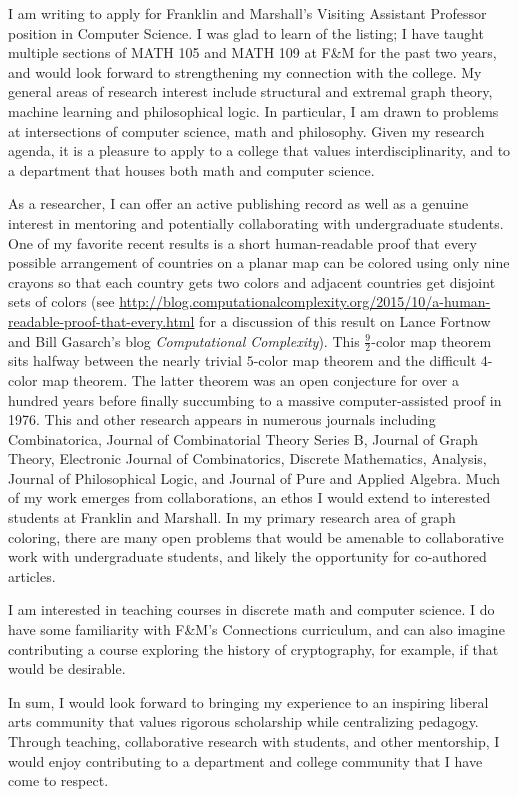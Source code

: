 \documentclass[10pt,stdletter,dateno]{newlfm}
\begin{document}
\begin{newlfm}

I am writing to apply for Franklin and Marshall's Visiting Assistant Professor position in Computer Science.
I was glad to learn of the listing; 
I have taught multiple sections of MATH 105 and MATH 109 at F\&M for the past two years, and would look forward to strengthening my connection with the college. 
My general areas of research interest include structural and extremal graph theory, machine learning and philosophical logic. In particular, I am 
drawn to problems at intersections of computer science, math and philosophy. Given my research agenda, it is a pleasure to apply to a college that values interdisciplinarity, 
and to a department that houses both math and computer science.  

As a researcher, I can offer an active publishing record as well as a genuine interest in mentoring and potentially collaborating with undergraduate students. 
One of my favorite recent results is a short human-readable proof that every possible arrangement of countries on a planar map can be colored using only nine crayons so that each country
gets two colors and adjacent countries get disjoint sets of colors 
(see \url{http://blog.computationalcomplexity.org/2015/10/a-human-readable-proof-that-every.html} for a 
discussion of this result on Lance Fortnow and Bill Gasarch's blog \emph{Computational Complexity}).  This $\frac92$-color map theorem sits halfway between the nearly trivial $5$-color map theorem and the difficult
$4$-color map theorem.  The latter theorem was an open conjecture for over a hundred years before finally succumbing to a massive computer-assisted proof in 1976.
This and other research appears in numerous journals including Combinatorica, Journal of Combinatorial Theory Series B, Journal of Graph Theory, Electronic Journal of Combinatorics,
Discrete Mathematics, Analysis, Journal of Philosophical Logic, and Journal of Pure and Applied Algebra. Much of my work emerges from collaborations, an ethos I would 
extend to interested students at Franklin and Marshall. In my primary research area of graph coloring, there are many open problems that would be amenable to collaborative 
work with undergraduate students, and likely the opportunity for co-authored articles. 

I am interested in teaching courses in discrete math and computer science.
I do have some familiarity with F\&M’s Connections curriculum, and can also imagine contributing a course exploring the history of cryptography, 
for example, if that would be desirable. 

In sum, I would look forward to bringing my experience to an inspiring liberal arts community that values rigorous scholarship while centralizing pedagogy. Through 
teaching, collaborative research with students, and other mentorship, I would enjoy contributing to a department and college community that I have come to respect.
\end{newlfm}
\end{document}
